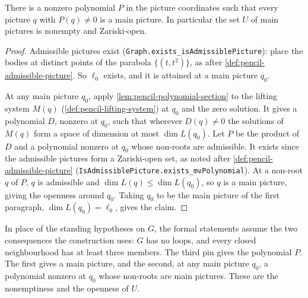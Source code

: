 \begin{lemma}
  \label{lem:pencil-x0-main-picture-open}
  \leanok
  There is a nonzero polynomial $P$ in the picture coordinates such that
  every picture $q$ with $P(q) \neq 0$ is a main picture. In particular
  the set $U$ of main pictures is nonempty and Zariski-open.
\end{lemma}
\begin{proof}
  \leanok
  Admissible pictures exist
  (\texttt{Graph.\allowbreak{}exists\_\allowbreak{}isAdmissiblePicture}): place
  the bodies at distinct points of the parabola $\{(t, t^2)\}$, as after
  \cref{def:pencil-admissible-picture}.
  So $\ell_0$ exists, and it is attained at a main picture $q_0$.

  At any main picture $q_0$, apply \cref{lem:pencil-polynomial-section}
  to the lifting system $M(q)$ (\cref{def:pencil-lifting-system}) at
  $q_0$ and the zero solution. It gives a polynomial $D$, nonzero at
  $q_0$, such that wherever $D(q) \neq 0$ the solutions of $M(q)$ form a
  space of dimension at most $\dim L(q_0)$. Let $P$ be the product of $D$
  and a polynomial nonzero at $q_0$ whose non-roots are admissible. It
  exists since the admissible pictures form a Zariski-open set, as noted
  after \cref{def:pencil-admissible-picture}
  (\texttt{IsAdmissiblePicture.\allowbreak{}exists\_\allowbreak{}mvPolynomial}).
  At a non-root $q$ of $P$, $q$ is admissible and
  $\dim L(q) \le \dim L(q_0)$, so $q$ is a main picture, giving the
  openness around $q_0$. Taking $q_0$ to be the main picture of the
  first paragraph, $\dim L(q_0) = \ell_0$, gives the claim.
\end{proof}
\begin{fmlnote}
  \label{fmlnote:pencil-x0-main-picture-open}
  In place of the standing hypotheses on $G$, the formal statements
  assume the two consequences the construction uses: $G$ has no loops,
  and every closed neighbourhood has at least three members. The third
  pin gives the polynomial $P$. The first gives a main picture, and the
  second, at any main picture $q_0$, a polynomial nonzero at $q_0$ whose
  non-roots are main pictures. These are the nonemptiness and the
  openness of $U$.
\end{fmlnote}

